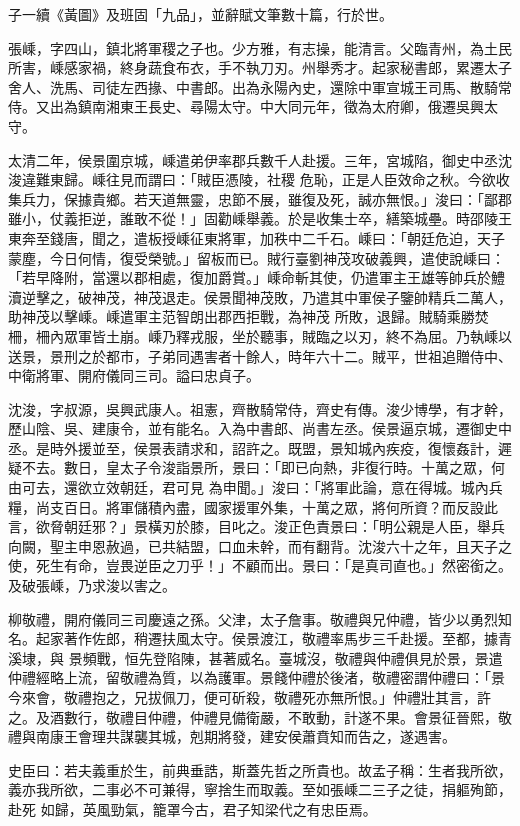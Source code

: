 \begin{pinyinscope}
 子一續《黃圖》及班固「九品」，並辭賦文筆數十篇，行於世。



 張嵊，字四山，鎮北將軍稷之子也。少方雅，有志操，能清言。父臨青州，為土民所害，嵊感家禍，終身蔬食布衣，手不執刀刃。州舉秀才。起家秘書郎，累遷太子舍人、洗馬、司徒左西掾、中書郎。出為永陽內史，還除中軍宣城王司馬、散騎常侍。又出為鎮南湘東王長史、尋陽太守。中大同元年，徵為太府卿，俄遷吳興太守。



 太清二年，侯景圍京城，嵊遣弟伊率郡兵數千人赴援。三年，宮城陷，御史中丞沈浚違難東歸。嵊往見而謂曰：「賊臣憑陵，社稷
 危恥，正是人臣效命之秋。今欲收集兵力，保據貴鄉。若天道無靈，忠節不展，雖復及死，誠亦無恨。」浚曰：「鄙郡雖小，仗義拒逆，誰敢不從！」固勸嵊舉義。於是收集士卒，繕築城壘。時邵陵王東奔至錢唐，聞之，遣板授嵊征東將軍，加秩中二千石。嵊曰：「朝廷危迫，天子蒙塵，今日何情，復受榮號。」留板而已。賊行臺劉神茂攻破義興，遣使說嵊曰：「若早降附，當還以郡相處，復加爵賞。」嵊命斬其使，仍遣軍主王雄等帥兵於鱧瀆逆擊之，破神茂，神茂退走。侯景聞神茂敗，乃遣其中軍侯子鑒帥精兵二萬人，助神茂以擊嵊。嵊遣軍主范智朗出郡西拒戰，為神茂
 所敗，退歸。賊騎乘勝焚柵，柵內眾軍皆土崩。嵊乃釋戎服，坐於聽事，賊臨之以刃，終不為屈。乃執嵊以送景，景刑之於都市，子弟同遇害者十餘人，時年六十二。賊平，世祖追贈侍中、中衛將軍、開府儀同三司。謚曰忠貞子。



 沈浚，字叔源，吳興武康人。祖憲，齊散騎常侍，齊史有傳。浚少博學，有才幹，歷山陰、吳、建康令，並有能名。入為中書郎、尚書左丞。侯景逼京城，遷御史中丞。是時外援並至，侯景表請求和，詔許之。既盟，景知城內疾疫，復懷姦計，遲疑不去。數日，皇太子令浚詣景所，景曰：「即已向熱，非復行時。十萬之眾，何由可去，還欲立效朝廷，君可見
 為申聞。」浚曰：「將軍此論，意在得城。城內兵糧，尚支百日。將軍儲積內盡，國家援軍外集，十萬之眾，將何所資？而反設此言，欲脅朝廷邪？」景橫刃於膝，目叱之。浚正色責景曰：「明公親是人臣，舉兵向闕，聖主申恩赦過，已共結盟，口血未幹，而有翻背。沈浚六十之年，且天子之使，死生有命，豈畏逆臣之刀乎！」不顧而出。景曰：「是真司直也。」然密銜之。及破張嵊，乃求浚以害之。



 柳敬禮，開府儀同三司慶遠之孫。父津，太子詹事。敬禮與兄仲禮，皆少以勇烈知名。起家著作佐郎，稍遷扶風太守。侯景渡江，敬禮率馬步三千赴援。至都，據青溪埭，與
 景頻戰，恒先登陷陳，甚著威名。臺城沒，敬禮與仲禮俱見於景，景遣仲禮經略上流，留敬禮為質，以為護軍。景餞仲禮於後渚，敬禮密謂仲禮曰：「景今來會，敬禮抱之，兄拔佩刀，便可斫殺，敬禮死亦無所恨。」仲禮壯其言，許之。及酒數行，敬禮目仲禮，仲禮見備衛嚴，不敢動，計遂不果。會景征晉熙，敬禮與南康王會理共謀襲其城，剋期將發，建安侯蕭賁知而告之，遂遇害。



 史臣曰：若夫義重於生，前典垂誥，斯蓋先哲之所貴也。故孟子稱：生者我所欲，義亦我所欲，二事必不可兼得，寧捨生而取義。至如張嵊二三子之徒，捐軀殉節，赴死
 如歸，英風勁氣，籠罩今古，君子知梁代之有忠臣焉。



\end{pinyinscope}